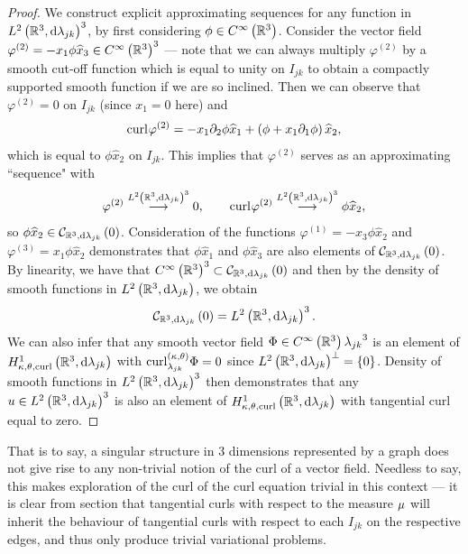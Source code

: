 \begin{proof}
	We construct explicit approximating sequences for any function in $L^{2}\left( \mathbb{R}^3,\mathrm{d} \lambda_{jk} \right)^3$, by first considering $\phi\in C^{\infty}\left( \mathbb{R}^3 \right)$.
	Consider the vector field $\varphi^{(2)} = -x_1\phi\widehat{x}_3\in C^{\infty}\left( \mathbb{R}^3 \right)^3$ --- note that we can always multiply $\varphi^{(2)}$ by a smooth cut-off function which is equal to unity on $I_{jk}$ to obtain a compactly supported smooth function if we are so inclined.
	Then we can observe that $\varphi^{(2)}=0$ on $I_{jk}$ (since $x_1=0$ here) and 
	\begin{align*}
		\mathrm{curl}_{}\varphi^{(2)} = -x_1\partial_2\phi\widehat{x}_1 + \left( \phi + x_1\partial_1\phi \right)\widehat{x}_2,
	\end{align*}
	which is equal to $\phi\widehat{x}_2$ on $I_{jk}$.
	This implies that $\varphi^{(2)}$ serves as an approximating ``sequence" with
	\begin{align*}
		\varphi^{(2)} \overset{L^{2}\left( \mathbb{R}^3,\mathrm{d} \lambda_{jk} \right)^3}{\longrightarrow} 0, 
		\qquad
		\mathrm{curl}_{}\varphi^{(2)} \overset{L^{2}\left( \mathbb{R}^3,\mathrm{d} \lambda_{jk} \right)^3}{\longrightarrow} \phi\widehat{x}_2,
	\end{align*}
	so $\phi\widehat{x}_2\in\mathcal{C}_{ \mathbb{R}^3, \mathrm{d}\lambda_{jk}}\left( 0 \right)$.
	Consideration of the functions $\varphi^{(1)} = -x_3\phi\widehat{x}_2$ and $\varphi^{(3)}=x_1\phi\widehat{x}_2$ demonstrates that $\phi\widehat{x}_1$ and $\phi\widehat{x}_3$ are also elements of $\mathcal{C}_{ \mathbb{R}^3, \mathrm{d}\lambda_{jk}}\left( 0 \right)$.
	By linearity, we have that $C^{\infty}\left( \mathbb{R}^3 \right)^3\subset\mathcal{C}_{ \mathbb{R}^3, \mathrm{d}\lambda_{jk}}\left( 0 \right)$ and then by the density of smooth functions in $L^{2}\left( \mathbb{R}^3,\mathrm{d} \lambda_{jk} \right)$, we obtain
	\begin{align*}
		\mathcal{C}_{ \mathbb{R}^3, \mathrm{d}\lambda_{jk}}\left( 0 \right) = L^{2}\left( \mathbb{R}^3,\mathrm{d} \lambda_{jk} \right)^3.
	\end{align*}
	We can also infer that any smooth vector field $\Phi\in C^{\infty}\left( \mathbb{R}^3 \right){\lambda_{jk}}^3$ is an element of $H^1_{\kappa,\theta,\mathrm{curl}}\left( \mathbb{R}^3, \mathrm{d}\lambda_{jk} \right)$ with $\mathrm{curl}_{\lambda_{jk}}^{\left( \kappa, \theta \right)}\Phi = 0$ since $L^{2}\left( \mathbb{R}^3,\mathrm{d} \lambda_{jk} \right)^{\perp} = \left\{ 0 \right\}$.
	Density of smooth functions in $L^{2}\left( \mathbb{R}^3,\mathrm{d} \lambda_{jk} \right)^3$ then demonstrates that any $u\in L^{2}\left( \mathbb{R}^3,\mathrm{d} \lambda_{jk} \right)^3$ is also an element of $H^1_{\kappa,\theta,\mathrm{curl}}\left( \mathbb{R}^3, \mathrm{d}\lambda_{jk} \right)$ with tangential curl equal to zero.
\end{proof}
That is to say, a singular structure in 3 dimensions represented by a graph does not give rise to any non-trivial notion of the curl of a vector field.
Needless to say, this makes exploration of the curl of the curl equation trivial in this context --- it is clear from section  that tangential curls with respect to the measure $\mu$ will inherit the behaviour of tangential curls with respect to each $I_{jk}$ on the respective edges, and thus only produce trivial variational problems.

